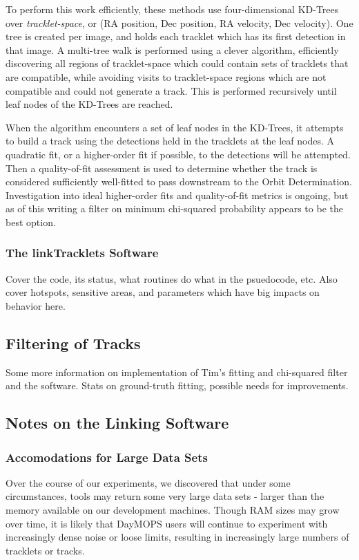 To perform this work efficiently, these methods use four-dimensional
KD-Trees over \textit{tracklet-space}, or (RA position, Dec position,
RA velocity, Dec velocity). One tree is created per image, and holds
each tracklet which has its first detection in that image.  A
multi-tree walk is performed using a clever algorithm, efficiently
discovering all regions of tracklet-space which could contain sets of
tracklets that are compatible, while avoiding visits to tracklet-space
regions which are not compatible and could not generate a track.  This
is performed recursively until leaf nodes of the KD-Trees are reached.


When the algorithm encounters a set of leaf nodes in the KD-Trees, it
attempts to build a track using the detections held in the tracklets
at the leaf nodes.  A quadratic fit, or a higher-order fit if
possible, to the detections will be attempted.  Then a quality-of-fit
assessment is used to determine whether the track is considered
sufficiently well-fitted to pass downstream to the Orbit
Determination.  Investigation into ideal higher-order fits and
quality-of-fit metrics is ongoing, but as of this writing a filter on
minimum chi-squared probability appears to be the best option.

\subsubsection{The linkTracklets Software}
Cover the code, its status, what routines do what in the psuedocode,
etc.  Also cover hotspots, sensitive areas, and parameters which have
big impacts on behavior here.


\subsection{Filtering of Tracks}
Some more information on implementation of Tim's fitting and
chi-squared filter and the software. Stats on ground-truth fitting,
possible needs for improvements.


\subsection{Notes on the Linking Software}

\subsubsection{Accomodations for Large Data Sets}
\label{largeData}
Over the course of our experiments, we discovered that under some
circumstances, tools may return some very large data sets - larger
than the memory available on our development machines.  Though RAM
sizes may grow over time, it is likely that DayMOPS users will
continue to experiment with increasingly dense noise or loose limits,
resulting in increasingly large numbers of tracklets or tracks.

